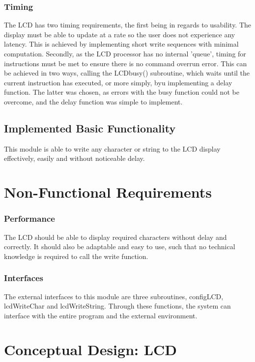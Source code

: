 \documentclass[]{report}
\begin{document}
\subsubsection{Timing}
The LCD has two timing requirements, the first being in regards to usability. The display must be able to update at a rate so the user does not experience any latency. This is achieved by implementing short write sequences with minimal computation.\newline
Secondly, as the LCD processor has no internal 'queue', timing for instructions must be met to ensure there is no command overrun error. This can be achieved in two ways, calling the LCDbusy() subroutine, which waits until the current instruction has executed, or more simply, byu implementing a delay function. The latter was chosen, as errors with the busy function could not be overcome, and the delay function was simple to implement.

\subsection{Implemented Basic Functionality}
This module is able to write any character or string to the LCD display effectively, easily and without noticeable delay.

\section{Non-Functional Requirements}

\subsubsection{Performance}
The LCD should be able to display required characters without delay and correctly. It should also be adaptable and easy to use, such that no technical knowledge is required to call the write function.

\subsubsection{Interfaces}
The external interfaces to this module are three subroutines, configLCD, lcdWriteChar and lcdWriteString. Through these functions, the system can interface with the entire program and the external environment.

\section{Conceptual Design: LCD}
\end{document}
